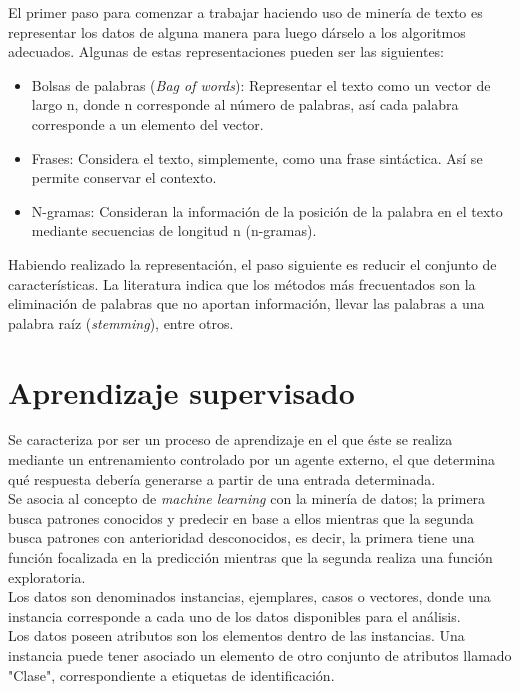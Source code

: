 	El primer paso para comenzar a trabajar haciendo uso de minería de texto es representar los datos de alguna manera para luego dárselo a los algoritmos adecuados. Algunas de estas representaciones pueden ser las siguientes:\\

	\begin{itemize}
	\item Bolsas de palabras (\textit{Bag of words}): Representar el texto como un vector de largo n, donde n corresponde al número de palabras, así cada palabra corresponde a un elemento del vector.
	\item Frases: Considera el texto, simplemente, como una frase sintáctica. Así se permite conservar el contexto.
	\item N-gramas: Consideran la información de la posición de la palabra en el texto mediante secuencias de longitud n (n-gramas). 
	\end{itemize}

	Habiendo realizado la representación, el paso siguiente es reducir el conjunto de características. La literatura indica que los métodos más frecuentados son la eliminación de palabras que no aportan información, llevar las palabras a una palabra raíz (\textit{stemming}), entre otros.\\

\section{Aprendizaje supervisado}
\label{sec:aprendSuperv}
Se caracteriza por ser un proceso de aprendizaje en el que éste se realiza mediante un entrenamiento controlado por un agente externo, el que determina qué respuesta debería generarse a partir de una entrada determinada.\\

Se asocia al concepto de \textit{machine learning} con la minería de datos; la primera busca patrones conocidos y predecir en base a ellos mientras que la segunda busca patrones con anterioridad desconocidos, es decir, la primera tiene una función focalizada en la predicción mientras que la segunda realiza una función exploratoria.\\

Los datos son denominados instancias, ejemplares, casos o vectores, donde una instancia corresponde a cada uno de los datos disponibles para el análisis.\\

Los datos poseen atributos son los elementos dentro de las instancias. Una instancia puede tener asociado un elemento de otro conjunto de atributos llamado "Clase", correspondiente a etiquetas de identificación.\\

